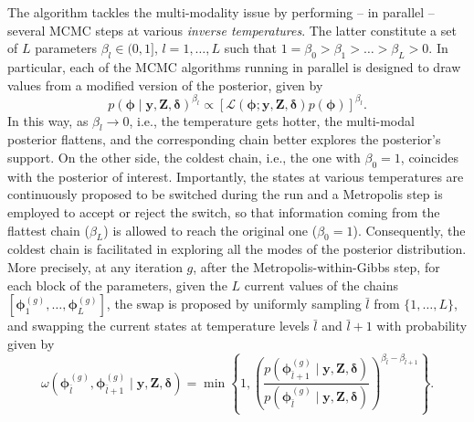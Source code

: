 \documentclass[final]{statsoc}
\newcommand{\bs}{\boldsymbol}
\begin{document}
The algorithm tackles the multi-modality issue by performing -- in parallel -- several MCMC steps at various \emph{inverse temperatures}. The latter constitute a set of $L$ parameters $\beta_{l} \in (0,1]$, $l = 1,\dots,L$ such that $1=\beta_{0} > \beta_{1} > \dots > \beta_{L} > 0$. In particular, each of the MCMC algorithms running in parallel is designed to draw values from a modified version of the posterior, given by
%
\begin{equation*}
    p(\bs{\phi} \mid \mathbf{y}, \mathbf{Z}, \bs{\delta})^{\beta_{l}} \propto [\mathcal{L}(\bs{\phi};\mathbf{y}, \mathbf{Z}, \bs{\delta}) p(\bs{\phi}) ]^{\beta_{l}}.
\end{equation*}
%
In this way, as $\beta_{l} \rightarrow 0$, i.e., the temperature gets hotter, the multi-modal posterior flattens, 
and the corresponding chain better explores the posterior's support. On the other side, the coldest chain, i.e., the one with $\beta_0=1$,  coincides with the posterior of interest. Importantly, the states at various temperatures are continuously proposed to be switched during the run and a Metropolis step is employed to accept or reject the switch, so that information coming from the flattest chain ($\beta_{L}$) is allowed to reach the original one ($\beta_{0}=1$). Consequently, the coldest chain is facilitated in exploring all the modes of the posterior distribution. More precisely, at any iteration $g$, after the Metropolis-within-Gibbs step, for each block of the parameters, given the $L$ current values of the chains $\left[\bs{\phi}_{1}^{(g)},\dots,\bs{\phi}_{L}^{(g)}\right]$, the swap is proposed by uniformly sampling $\bar{l}$ from $\{1,\dots,L\}$, and swapping the current states at temperature levels $\bar{l}$ and $\bar{l} + 1$ with probability given by 
%
\begin{equation*}
    \omega\left(\bs{\phi}_{\bar{l}}^{(g)},\bs{\phi}_{\bar{l} + 1}^{(g)} \mid \mathbf{y}, \mathbf{Z}, \bs{\delta} \right) = \min \left\{ 1, \left( \frac{p\left( \bs{\phi}_{\bar{l} + 1}^{(g)} \mid \mathbf{y}, \mathbf{Z}, \bs{\delta} \right)}{p\left( \bs{\phi}_{\bar{l}}^{(g)} \mid \mathbf{y}, \mathbf{Z}, \bs{\delta} \right)} \right)^{\beta_{\bar{l}}-\beta_{\bar{l} + 1}} \right\}.
\end{equation*}
\end{document}
